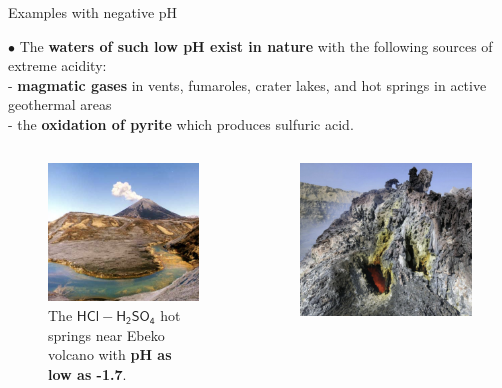 \begin{frame}{Examples with negative pH}

$\bullet$ The \alert{\bf waters of such low pH exist in nature} with the following sources of extreme acidity: \\
\quad - {\bf magmatic gases} %
in vents, fumaroles, crater lakes, and hot springs in active geothermal areas \\
\quad - the {\bf oxidation of pyrite} which produces sulfuric acid. \\ 

\begin{columns}[t]
\begin{figure}
\centering
\includegraphics[width=0.9\columnwidth]{figures/chemical-equilibrium/ebeko.png}
\caption*{The $\mathsf{HCl-H_2SO_4}$ hot springs 
near Ebeko volcano with {\bf pH as low as -1.7}.}
\end{figure}
\begin{figure}
\centering
\includegraphics[width=0.9\columnwidth]{figures/chemical-equilibrium/kilauea.png}

\end{figure}
\end{columns}
\end{frame}
